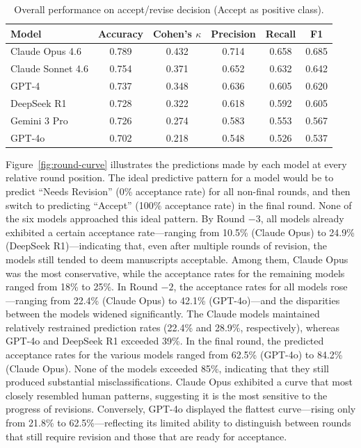\documentclass[preprint,10pt,times]{elsarticle}
\begin{document}
\begin{table}[htbp]
\centering
\caption{Overall performance on accept/revise decision (Accept as positive class).}
\label{tab:task3}
\begin{tabular}{l ccccc}
\toprule
\textbf{Model} & \textbf{Accuracy} & \textbf{Cohen's $\kappa$} & \textbf{Precision} & \textbf{Recall} & \textbf{F1} \\
\midrule
Claude Opus 4.6   & 0.789 & 0.432 & 0.714 & 0.658 & 0.685 \\
Claude Sonnet 4.6 & 0.754 & 0.371 & 0.652 & 0.632 & 0.642 \\
GPT-4             & 0.737 & 0.348 & 0.636 & 0.605 & 0.620 \\
DeepSeek R1       & 0.728 & 0.322 & 0.618 & 0.592 & 0.605 \\
Gemini 3 Pro       & 0.726 & 0.274 & 0.583 & 0.553 & 0.567 \\
GPT-4o            & 0.702 & 0.218 & 0.548 & 0.526 & 0.537 \\
\bottomrule
\end{tabular}
\end{table}

Figure~\ref{fig:round-curve} illustrates the predictions made by each model at every relative round position. The ideal predictive pattern for a model would be to predict ``Needs Revision'' (0\% acceptance rate) for all non-final rounds, and then switch to predicting ``Accept'' (100\% acceptance rate) in the final round. None of the six models approached this ideal pattern. By Round $-3$, all models already exhibited a certain acceptance rate---ranging from 10.5\% (Claude Opus) to 24.9\% (DeepSeek R1)---indicating that, even after multiple rounds of revision, the models still tended to deem manuscripts acceptable. Among them, Claude Opus was the most conservative, while the acceptance rates for the remaining models ranged from 18\% to 25\%. In Round $-2$, the acceptance rates for all models rose---ranging from 22.4\% (Claude Opus) to 42.1\% (GPT-4o)---and the disparities between the models widened significantly. The Claude models maintained relatively restrained prediction rates (22.4\% and 28.9\%, respectively), whereas GPT-4o and DeepSeek R1 exceeded 39\%. In the final round, the predicted acceptance rates for the various models ranged from 62.5\% (GPT-4o) to 84.2\% (Claude Opus). None of the models exceeded 85\%, indicating that they still produced substantial misclassifications. Claude Opus exhibited a curve that most closely resembled human patterns, suggesting it is the most sensitive to the progress of revisions. Conversely, GPT-4o displayed the flattest curve---rising only from 21.8\% to 62.5\%---reflecting its limited ability to distinguish between rounds that still require revision and those that are ready for acceptance.
\end{document}
